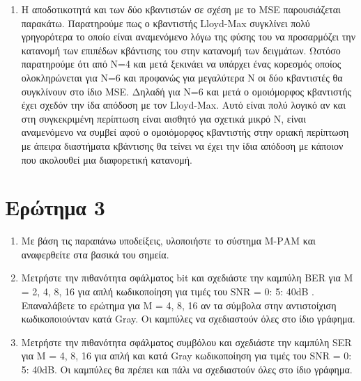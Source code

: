 \documentclass{article}
\begin{document}
\begin{enumerate}
\begin{enumerate}[label=(\roman*)]
            \item Η αποδοτικοτητά και των δύο κβαντιστών σε σχέση με το MSE παρουσιάζεται παρακάτω. Παρατηρούμε πως ο κβαντιστής Lloyd-Max συγκλίνει πολύ γρηγορότερα το οποίο είναι αναμενόμενο λόγω της φύσης του να προσαρμόζει την κατανομή των επιπέδων κβάντισης του στην κατανομή των δειγμάτων. Ωστόσο παρατηρούμε ότι από Ν=4 και μετά ξεκινάει να υπάρχει ένας κορεσμός οποίος ολοκληρώνεται για Ν=6 και προφανώς για μεγαλύτερα Ν οι δύο κβαντιστές θα συγκλίνουν στο ίδιο MSE. Δηλαδή για Ν=6 και μετά ο ομοιόμορφος κβαντιστής έχει σχεδόν την ίδα απόδοση με τον Lloyd-Max. Αυτό είναι πολύ λογικό αν και στη συγκεκριμένη περίπτωση είναι αισθητό για σχετικά μικρό Ν, είναι αναμενόμενο να συμβεί αφού ο ομοιόμορφος κβαντιστής στην οριακή περίπτωση με άπειρα διαστήματα κβάντισης θα τείνει να έχει την ίδια απόδοση με κάποιον που ακολουθεί μια διαφορετική κατανομή.
                \begin{figure}[H]
                \end{figure}
        \end{enumerate}
    \end{enumerate}

\newpage

\section{Ερώτημα 3}

\begin{enumerate}
    \item Με βάση τις παραπάνω υποδείξεις, υλοποιήστε το σύστημα Μ-PΑΜ και
    αναφερθείτε στα βασικά του σημεία.
    \item Μετρήστε την πιθανότητα σφάλματος bit και σχεδιάστε την καμπύλη
    BER για Μ = 2, 4, 8, 16 για απλή κωδικοποίηση για τιμές του SNR =
    0: 5: 40dB . Επαναλάβετε το ερώτημα για Μ = 4, 8, 16 αν τα σύμβολα στην
    αντιστοίχιση κωδικοποιούνταν κατά Gray. Οι καμπύλες να σχεδιαστούν
    όλες στο ίδιο γράφημα.
    \item Μετρήστε την πιθανότητα σφάλματος συμβόλου και σχεδιάστε την
    καμπύλη SER για M = 4, 8, 16 για απλή και κατά Gray κωδικοποίηση για
    τιμές του SNR = 0: 5: 40dB. Οι καμπύλες θα πρέπει και πάλι να
    σχεδιαστούν όλες στο ίδιο γράφημα.
\end{enumerate}
\end{document}
